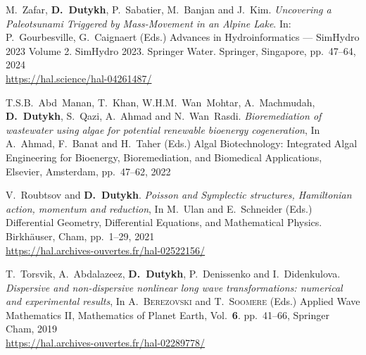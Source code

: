 \documentclass[final, a4paper, oneside, 12pt]{article}
\numberwithin{equation}{section}
\begin{document}
\begin{etaremune}



  \item M.~Zafar, \textbf{D.~Dutykh}, P.~Sabatier, M.~Banjan and J.~Kim. \textit{Uncovering a Paleotsunami Triggered by Mass-Movement in an Alpine Lake}. In: P.~Gourbesville, G.~Caignaert (Eds.) Advances in Hydroinformatics --- SimHydro 2023 Volume 2. SimHydro 2023. Springer Water. Springer, Singapore, pp.~47--64, 2024 \\ %
  \url{https://hal.science/hal-04261487/}


  
  \item T.S.B.~Abd~Manan, T.~Khan, W.H.M.~Wan~Mohtar, A.~Machmudah, \textbf{D.~Dutykh}, S.~Qazi, A.~Ahmad and N.~Wan~Rasdi. \textit{Bioremediation of wastewater using algae for potential renewable bioenergy cogeneration}, In A.~Ahmad, F.~Banat and H.~Taher (Eds.) Algal Biotechnology: Integrated Algal Engineering for Bioenergy, Bioremediation, and Biomedical Applications, Elsevier, Amsterdam, pp.~47--62, 2022 %


  
  \item V.~Roubtsov and \textbf{D.~Dutykh}. \textit{Poisson and Symplectic structures, Hamiltonian action, momentum and reduction}, In M.~Ulan and E.~Schneider (Eds.) Differential Geometry, Differential Equations, and Mathematical Physics. Birkh\"auser, Cham, pp.~1--29, 2021 \\ %
  \url{https://hal.archives-ouvertes.fr/hal-02522156/}



  \item T.~Torsvik, A.~Abdalazeez, \textbf{D.~Dutykh}, P.~Denissenko and I.~Didenkulova. \textit{Dispersive and non-dispersive nonlinear long wave transformations: numerical and experimental results}, In A.~\textsc{Berezovski} and T.~\textsc{Soomere} (Eds.) Applied Wave Mathematics II, Mathematics of Planet Earth, Vol.~\textbf{6}. pp.~41--66, Springer Cham, 2019 \\ %
  \url{https://hal.archives-ouvertes.fr/hal-02289778/}
  

\end{etaremune}
\end{document}
